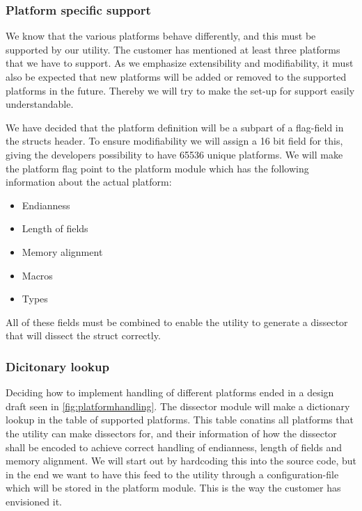 \subsubsection{Platform specific support}
We know that the various platforms behave differently, and this must be supported by our \gls{utility}. The customer has mentioned at least three platforms that we have to support. As we emphasize extensibility and modifiability, it must also be expected that new platforms will be added or removed to the supported platforms in the future. Thereby we will try to make the set-up for support easily understandable.

We have decided that the platform definition will be a subpart of a flag-field in the structs header. To ensure modifiability we will assign a 16 bit field for this, giving the developers possibility to have 65536 unique platforms. We will make the platform flag point to the platform module which has the following information about the actual platform:
\begin{itemize}
\item Endianness
\item Length of fields
\item Memory alignment
\item Macros
\item Types
\end{itemize}
All of these fields must be combined to enable the utility to generate a \gls{dissector} that will dissect the struct correctly.\\

\subsubsection{Dicitonary lookup}
Deciding how to implement handling of different platforms ended in a design draft seen in \autoref{fig:platformhandling}. The \gls{dissector} module will make a dictionary lookup in the table of supported platforms. This table conatins all platforms that the \gls{utility} can make \glspl{dissector} for, and their information of how the \gls{dissector} shall be encoded to achieve correct handling of \gls{endianness}, length of fields and memory alignment.
We will start out by hardcoding this into the source code, but in the end we want to have this feed to the \gls{utility} through a configuration-file which will be stored in the platform module. This is the way the customer has envisioned it.  

